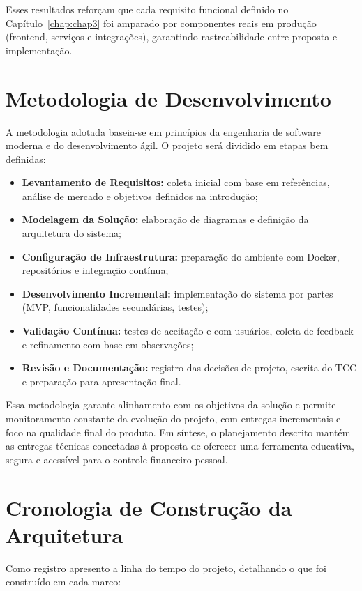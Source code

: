 Esses resultados reforçam que cada requisito funcional definido no Capítulo~\ref{chap:chap3} foi amparado por componentes reais em produção (frontend, serviços e integrações), garantindo rastreabilidade entre proposta e implementação.

\section{Metodologia de Desenvolvimento}

A metodologia adotada baseia-se em princípios da engenharia de software moderna e do desenvolvimento ágil. O projeto será dividido em etapas bem definidas:

\begin{itemize}
    \item \textbf{Levantamento de Requisitos:} coleta inicial com base em referências, análise de mercado e objetivos definidos na introdução;
    \item \textbf{Modelagem da Solução:} elaboração de diagramas e definição da arquitetura do sistema;
    \item \textbf{Configuração de Infraestrutura:} preparação do ambiente com Docker, repositórios e integração contínua;
    \item \textbf{Desenvolvimento Incremental:} implementação do sistema por partes (MVP, funcionalidades secundárias, testes);
    \item \textbf{Validação Contínua:} testes de aceitação e com usuários, coleta de feedback e refinamento com base em observações;
    \item \textbf{Revisão e Documentação:} registro das decisões de projeto, escrita do TCC e preparação para apresentação final.
\end{itemize}

Essa metodologia garante alinhamento com os objetivos da solução e permite monitoramento constante da evolução do projeto, com entregas incrementais e foco na qualidade final do produto. Em síntese, o planejamento descrito mantém as entregas técnicas conectadas à proposta de oferecer uma ferramenta educativa, segura e acessível para o controle financeiro pessoal.

\section{Cronologia de Construção da Arquitetura}

Como registro apresento a linha do tempo do projeto, detalhando o que foi construído em cada marco:

